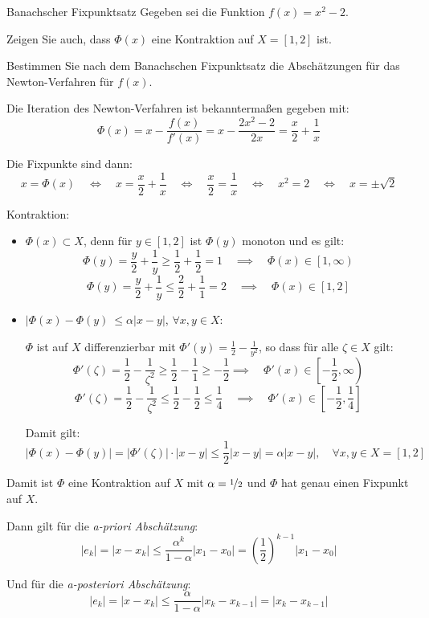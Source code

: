 \begin{example}{Banachscher Fixpunktsatz}
    Gegeben sei die Funktion $f(x) = x^2 - 2$. 
    
    Zeigen Sie auch, dass $\Phi(x)$ eine Kontraktion auf $X = [1, 2]$ ist.
    
    Bestimmen Sie nach dem Banachschen Fixpunktsatz die Abschätzungen für das Newton-Verfahren für $f(x)$. 
    
    \exampleseparator
    
    Die Iteration des Newton-Verfahren ist bekanntermaßen gegeben mit:
    \[ 
        \Phi(x) = x - \frac{f(x)}{f'(x)} = x - \frac{2x^2 - 2}{2x} = \frac{x}{2} + \frac{1}{x}
    \]
    
    Die Fixpunkte sind dann: 
    \[ 
        x = \Phi(x) \quad \iff \quad x = \frac{x}{2} + \frac{1}{x} \quad \iff \quad \frac{x}{2} = \frac{1}{x} \quad \iff \quad x^2 = 2 \quad \iff \quad x = \pm \sqrt{2}
    \]
    
    Kontraktion: 
    \begin{itemize}
        \item $\Phi(x) \subset X$, denn für $y \in [1, 2]$ ist $\Phi(y)$ monoton und es gilt:
              \[ 
                  \Phi(y) = \frac{y}{2} + \frac{1}{y} \geq \frac{1}{2} + \frac{1}{2} = 1 \quad \implies \quad \Phi(x) \in \left[1, \infty\right)
              \]
              \[ 
                  \Phi(y) = \frac{y}{2} + \frac{1}{y} \leq \frac{2}{2} + \frac{1}{1} = 2 \quad \implies \quad \Phi(x) \in \left[1, 2\right]
              \]
        \item $|\Phi(x) - \Phi(y)\ \leq \alpha |x-y|$, $\forall x, y \in X$:
              
              $\Phi$ ist auf $X$ differenzierbar mit $\Phi'(y) = \frac{1}{2} - \frac{1}{y^2}$, so dass für alle $\zeta \in X$ gilt: 
              \[ 
                  \Phi'(\zeta) = \frac{1}{2} - \frac{1}{\zeta^2} \geq \frac{1}{2} - \frac{1}{1} \geq -\frac{1}{2} \implies \quad \Phi'(x) \in \left[-\frac{1}{2}, \infty\right)
              \]
              \[ 
                  \Phi'(\zeta) = \frac{1}{2} - \frac{1}{\zeta^2} \leq \frac{1}{2} - \frac{1}{2} \leq \frac{1}{4} \quad \implies \quad \Phi'(x) \in \left[-\frac{1}{2}, \frac{1}{4}\right]
              \]
              
              Damit gilt: 
              \[ 
                  |\Phi(x) - \Phi(y)| = |\Phi'(\zeta)| \cdot |x - y| \leq \frac{1}{2} |x-y| = \alpha |x-y|, \quad \forall x, y \in X = [1, 2]
              \]
    \end{itemize}
    
    Damit ist $\Phi$ eine Kontraktion auf $X$ mit $\alpha = \nicefrac{1}{2}$ und $\Phi$ hat genau einen Fixpunkt auf $X$.
    
    Dann gilt für die \emph{a-priori Abschätzung}: 
    \[ 
        |e_k| = |x - x_k| \leq \frac{\alpha^k}{1-\alpha} |x_1 - x_0| = \left(\frac{1}{2}\right)^{k-1} |x_1 - x_0|
    \]
    
    Und für die \emph{a-posteriori Abschätzung}:
    \[ 
        |e_k| = |x - x_k| \leq \frac{\alpha}{1-\alpha} |x_k - x_{k-1}| = |x_k - x_{k-1}|
    \]
\end{example}

